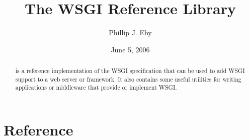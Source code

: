 \documentclass{manual}
\title{The WSGI Reference Library}
\author{Phillip J. Eby}
\date{June 5, 2006}       %
\begin{document}
\maketitle


%

\begin{abstract}
\noindent
{} is a reference implementation of the WSGI specification
that can be used to add WSGI support to a web server or framework.  It also
contains some useful utilities for writing applications or middleware that
provide or implement WSGI.
\end{abstract}

\tableofcontents

\chapter{Reference}













%
%
%
\renewcommand{\indexname}{Module Index}

\renewcommand{\indexname}{Index}
\end{document}
